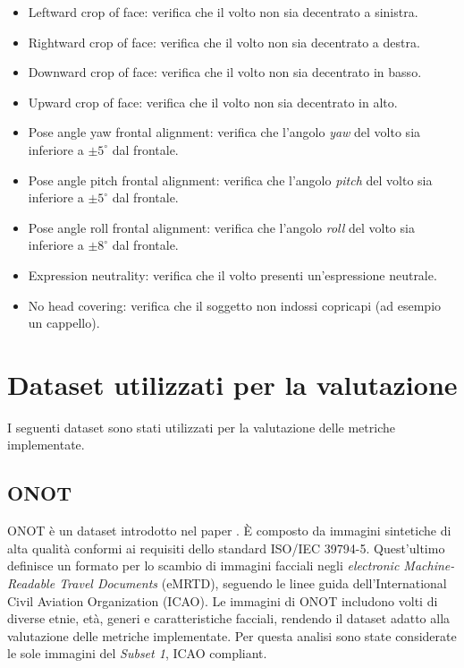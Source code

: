 \documentclass[12pt,a4paper,openright,twoside]{book}
\begin{document}
\begin{itemize}
    \item Leftward crop of face: verifica che il volto non sia decentrato a sinistra.
    \item Rightward crop of face: verifica che il volto non sia decentrato a destra.
    \item Downward crop of face: verifica che il volto non sia decentrato in basso.
    \item Upward crop of face: verifica che il volto non sia decentrato in alto.
    \item Pose angle yaw frontal alignment: verifica che l'angolo \textit{yaw} del volto sia inferiore a \(\pm 5^\circ\) dal frontale.
    \item Pose angle pitch frontal alignment: verifica che l'angolo \textit{pitch} del volto sia inferiore a \(\pm 5^\circ\) dal frontale.
    \item Pose angle roll frontal alignment: verifica che l'angolo \textit{roll} del volto sia inferiore a \(\pm 8^\circ\) dal frontale.
    \item Expression neutrality: verifica che il volto presenti un'espressione neutrale.
    \item No head covering: verifica che il soggetto non indossi copricapi (ad esempio un cappello).
\end{itemize}

\section{Dataset utilizzati per la valutazione}
I seguenti dataset sono stati utilizzati per la valutazione delle metriche implementate.

\subsection{ONOT}
ONOT è un dataset introdotto nel paper \cite[ONOT: a High-Quality ICAO-compliant Synthetic Mugshot Dataset]{di2024onot}.
È composto da immagini sintetiche di alta qualità conformi ai requisiti dello standard ISO/IEC 39794-5.
Quest'ultimo definisce un formato per lo scambio di immagini facciali negli \textit{electronic Machine-Readable Travel Documents} (eMRTD), seguendo le linee guida dell'International Civil Aviation Organization (ICAO).
Le immagini di ONOT includono volti di diverse etnie, età, generi e caratteristiche facciali, rendendo il dataset adatto alla valutazione delle metriche implementate.
Per questa analisi sono state considerate le sole immagini del \textit{Subset 1}, ICAO compliant.
\end{document}
